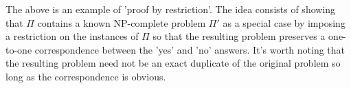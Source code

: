 	\noindent
	The above is an example of 'proof by restriction'. 
	The idea consists of showing that $\Pi$ contains a known NP-complete problem $\Pi'$ as a special case by imposing a restriction on the instances of $\Pi$ so that the resulting problem preserves a one-to-one correspondence between the 'yes' and 'no' answers. 
	It's worth noting that the resulting problem need not be an exact duplicate of the original problem so long as the correspondence is obvious. 
	
